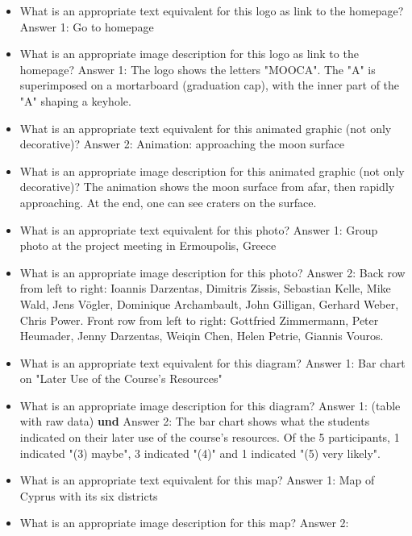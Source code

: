 \documentclass{article}
\begin{document}
\begin{enumerate}[label=(\alph*)]
\begin{itemize}
			\item What is an appropriate text equivalent for this logo as link to the homepage? \textcolor{green!90!black}{Answer 1: Go to homepage}
			\item What is an appropriate image description for this logo as link to the homepage? \textcolor{green!90!black}{Answer 1: The logo shows the letters "MOOCA".  The "A" is superimposed on a mortarboard (graduation cap), with the inner part of the "A" shaping a keyhole.}
			\item What is an appropriate text equivalent for this animated graphic (not only decorative)? \textcolor{green!90!black}{Answer 2: Animation: approaching the moon surface}
			\item What is an appropriate image description for this animated graphic (not only decorative)? \textcolor{green!90!black}{The animation shows the moon surface from afar, then rapidly approaching. At the end, one can see craters on the surface.}
			\item What is an appropriate text equivalent for this photo? \textcolor{green!90!black}{Answer 1: Group photo at the project meeting in Ermoupolis, Greece}
			\item What is an appropriate image description for this photo? \textcolor{green!90!black}{Answer 2: Back row from left to right: Ioannis Darzentas, Dimitris Zissis, Sebastian Kelle, Mike Wald, Jens Vögler, Dominique Archambault, John Gilligan, Gerhard Weber, Chris Power. Front row from left to right: Gottfried Zimmermann, Peter Heumader, Jenny Darzentas, Weiqin Chen, Helen Petrie, Giannis Vouros.}
			\item What is an appropriate text equivalent for this diagram? \textcolor{green!90!black}{Answer 1: Bar chart on "Later Use of the Course's Resources"}
			\item What is an appropriate image description for this diagram? \textcolor{green!90!black}{Answer 1: (table with raw data)} \textbf{und} \textcolor{green!90!black}{Answer 2: The bar chart shows what the students indicated on their later use of the course’s resources.  Of the 5 participants, 1 indicated "(3) maybe", 3 indicated "(4)" and 1 indicated "(5) very likely".}
			\item What is an appropriate text equivalent for this map? \textcolor{green!90!black}{Answer 1: Map of Cyprus with its six districts}
			\item What is an appropriate image description for this map? \textcolor{green!90!black}{Answer 2: 
}
\end{itemize}
\end{enumerate}
\end{document}
